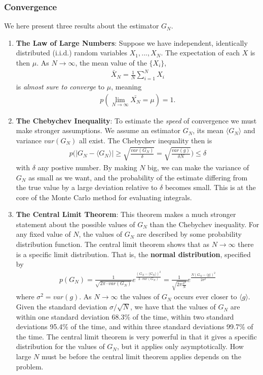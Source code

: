 \documentclass[twoside,english]{uiofysmaster}
\begin{document}
\subsubsection{Convergence}
We here present three results about the estimator $G_N$.

\begin{enumerate}
\item \textbf{The Law of Large Numbers}: Suppose we have independent, identically distributed (i.i.d.) random variables $X_1,...,X_N$. The expectation of each $X$ is then $\mu$. As $N\rightarrow \infty$, the mean value of the $\{ X_i \}$, 
\begin{align}
	\bar{X}_N = \frac{1}{N} \sum_{i=1}^N X_i
\end{align}
is \textit{almost sure to converge} to $\mu$, meaning
\begin{align}
	p(\lim_{N\to \infty} \bar{X_N} = \mu) = 1 .
\end{align}

\item \textbf{The Chebychev Inequality}:
To estimate the \textit{speed} of convergence we must make stronger assumptions. We assume an estimator $G_N$, its mean $\langle G_N \rangle$ and variance $var(G_N)$ all exist. The Chebychev inequality then is
\begin{align}
	p\bigg (|G_N - \langle G_N \rangle | \geq \sqrt{\frac{var(G_N)}{\delta}} = \sqrt{\frac{var(g)}{\delta N}} \bigg ) \leq \delta 
\end{align}
with $\delta$ any postive number. By making $N$ big, we can make the variance of $G_N$ as small as we want, and the probability of the estimate differing from the true value by a large deviation relative to $\delta$ becomes small. This is at the core of the Monte Carlo method for evaluating integrals.

\item \textbf{The Central Limit Theorem}:
This theorem makes a much stronger statement about the possible values of $G_N$ than the Chebychev inequality. For any fixed value of $N$, the values of $G_N$ are described by some probability distribution function. The central limit theorem shows that as $N\rightarrow \infty$ there is a specific limit distribution. That is, the \textbf{normal distribution}, specified by
\begin{align}
	p(G_N) = \frac{1}{\sqrt{2\pi \cdot var(G_N)}} e^\frac{( G_N - \langle G_N \rangle )^2 }{2 \cdot var(G_N)}
	= \frac{1}{\sqrt{2\pi \frac{\sigma^2}{N} }} e^{\frac{N(G_N - \langle g\rangle)^2}{2\sigma^2}}
\end{align}
where $\sigma^2 = var(g)$. 
As $N\rightarrow \infty$ the values of $G_N$ occurs ever closer to $\langle g \rangle$. Given the standard deviation $\sigma/\sqrt{N}$, we have that the values of $G_N$ are within one standard deviation 68.3\% of the time, within two standard deviations 95.4\% of the time, and within three standard deviations 99.7\% of the time.
The central limit theorem is very powerful in that it gives a specific distribution for the values of $G_N$, but it applies only asymptotically. How large $N$ must be before the central limit theorem applies depends on the problem.

\end{enumerate}
\end{document}
